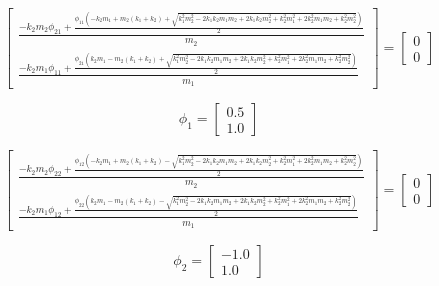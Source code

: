 \documentclass[
  letterpaper,
  DIV=11]{scrreprt}
\begin{document}
\begin{equation}\left[\begin{matrix}\frac{- k_{2} m_{2} \phi_{21} + \frac{\phi_{11} \left(- k_{2} m_{1} + m_{2} \left(k_{1} + k_{2}\right) + \sqrt{k_{1}^{2} m_{2}^{2} - 2 k_{1} k_{2} m_{1} m_{2} + 2 k_{1} k_{2} m_{2}^{2} + k_{2}^{2} m_{1}^{2} + 2 k_{2}^{2} m_{1} m_{2} + k_{2}^{2} m_{2}^{2}}\right)}{2}}{m_{2}}\\\frac{- k_{2} m_{1} \phi_{11} + \frac{\phi_{21} \left(k_{2} m_{1} - m_{2} \left(k_{1} + k_{2}\right) + \sqrt{k_{1}^{2} m_{2}^{2} - 2 k_{1} k_{2} m_{1} m_{2} + 2 k_{1} k_{2} m_{2}^{2} + k_{2}^{2} m_{1}^{2} + 2 k_{2}^{2} m_{1} m_{2} + k_{2}^{2} m_{2}^{2}}\right)}{2}}{m_{1}}\end{matrix}\right] = \left[\begin{matrix}0\\0\end{matrix}\right]\end{equation}

\begin{equation}\phi_{1} = \left[\begin{matrix}0.5\\1.0\end{matrix}\right]\end{equation}

\begin{equation}\left[\begin{matrix}\frac{- k_{2} m_{2} \phi_{22} + \frac{\phi_{12} \left(- k_{2} m_{1} + m_{2} \left(k_{1} + k_{2}\right) - \sqrt{k_{1}^{2} m_{2}^{2} - 2 k_{1} k_{2} m_{1} m_{2} + 2 k_{1} k_{2} m_{2}^{2} + k_{2}^{2} m_{1}^{2} + 2 k_{2}^{2} m_{1} m_{2} + k_{2}^{2} m_{2}^{2}}\right)}{2}}{m_{2}}\\\frac{- k_{2} m_{1} \phi_{12} + \frac{\phi_{22} \left(k_{2} m_{1} - m_{2} \left(k_{1} + k_{2}\right) - \sqrt{k_{1}^{2} m_{2}^{2} - 2 k_{1} k_{2} m_{1} m_{2} + 2 k_{1} k_{2} m_{2}^{2} + k_{2}^{2} m_{1}^{2} + 2 k_{2}^{2} m_{1} m_{2} + k_{2}^{2} m_{2}^{2}}\right)}{2}}{m_{1}}\end{matrix}\right] = \left[\begin{matrix}0\\0\end{matrix}\right]\end{equation}

\begin{equation}\phi_{2} = \left[\begin{matrix}-1.0\\1.0\end{matrix}\right]\end{equation}
\end{document}
